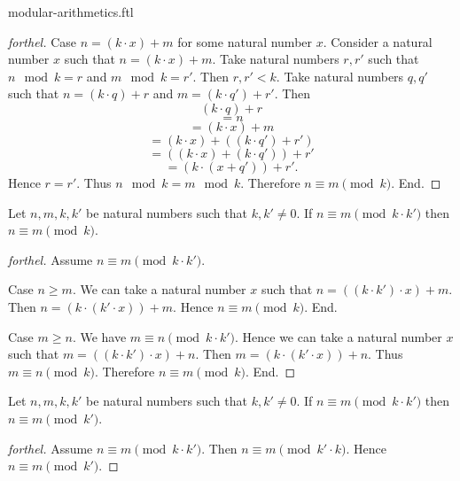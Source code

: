 \documentclass{naproche-library}
\begin{document}
\begin{smodule}{modular-arithmetics.ftl}
\begin{proof}[forthel]
    Case $n = (k \cdot x) + m$ for some natural number $x$.
      Consider a natural number $x$ such that $n = (k \cdot x) + m$.
      Take natural numbers $r, r'$ such that $n \mod k = r$ and $m \mod k = r'$.
      Then $r, r' < k$.
      Take natural numbers $q, q'$ such that $n = (k \cdot q) + r$ and $m = (k \cdot q') + r'$.
      Then
      \[  (k \cdot q) + r                         \]
      \[    = n                                   \]
      \[    = (k \cdot x) + m                     \]
      \[    = (k \cdot x) + ((k \cdot q') + r')   \]
      \[    = ((k \cdot x) + (k \cdot q')) + r'   \]
      \[    = (k \cdot (x + q')) + r'.            \]
      Hence $r = r'$.
      Thus $n \mod k = m \mod k$.
      Therefore $n \equiv m \pmod{k}$.
    End.
  \end{proof}

  \begin{proposition}[forthel,id=ARITHMETIC_08_2988318228742144,printid]
    Let $n, m, k, k'$ be natural numbers such that $k, k' \neq 0$.
    If $n \equiv m \pmod{k \cdot k'}$ then $n \equiv m \pmod{k}$.
  \end{proposition}
  \begin{proof}[forthel]
    Assume $n \equiv m \pmod{k \cdot k'}$.

    Case $n \geq m$.
      We can take a natural number $x$ such that $n = ((k \cdot k') \cdot x) + m$.
      Then $n = (k \cdot (k' \cdot x)) + m$.
      Hence $n \equiv m \pmod{k}$.
    End.

    Case $m \geq n$.
      We have $m \equiv n \pmod{k \cdot k'}$.
      Hence we can take a natural number $x$ such that $m = ((k \cdot k') \cdot x) + n$.
      Then $m = (k \cdot (k' \cdot x)) + n$.
      Thus $m \equiv n \pmod{k}$.
      Therefore $n \equiv m \pmod{k}$.
    End.
  \end{proof}

  \begin{corollary}[forthel,id=ARITHMETIC_08_5895145169879040,printid]
    Let $n, m, k, k'$ be natural numbers such that $k, k' \neq 0$.
    If $n \equiv m \pmod{k \cdot k'}$ then $n \equiv m \pmod{k'}$.
  \end{corollary}
  \begin{proof}[forthel]
    Assume $n \equiv m \pmod{k \cdot k'}$.
    Then $n \equiv m \pmod{k' \cdot k}$.
    Hence $n \equiv m \pmod{k'}$.
  \end{proof}


\end{smodule}
\end{document}
